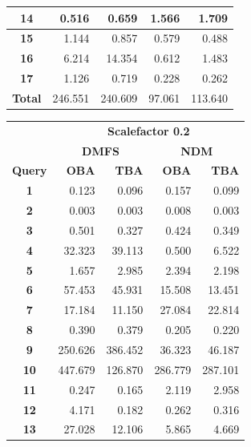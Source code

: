 \documentclass[a4paper]{article}
\begin{document}
\begin{figure}[h]
\begin{minipage}{0.5\linewidth}
\begin{tiny}
\begin{tabular}{|c|r|r|r|r|}
        \hline
        \textbf{14}&0.516&0.659&1.566&1.709\\
        \hline
        \textbf{15}&1.144&0.857&0.579&0.488\\
        \hline
        \textbf{16}&6.214&14.354&0.612&1.483\\
        \hline
        \textbf{17}&1.126&0.719&0.228&0.262\\
        \hline
        \textbf{Total}&246.551&240.609&97.061&113.640\\
        \hline
      \end{tabular}
    \end{tiny}
  \end{minipage} \hfill
  \begin{minipage}{0.5\linewidth}
    \begin{tiny}
      \begin{tabular}{|c|r|r|r|r|}
        \hline
        &\multicolumn{4}{c|}{\textbf{Scalefactor 0.2}}\\
        \cline{2-5}
        &\multicolumn{2}{c|}{\textbf{DMFS}}&\multicolumn{2}{c|}{\textbf{NDM}}\\
        \hline
        \textbf{Query}&\textbf{OBA}&\textbf{TBA}&\textbf{OBA}&\textbf{TBA}\\
        \hline
        \textbf{1}&0.123&0.096&0.157&0.099\\
        \hline
        \textbf{2}&0.003&0.003&0.008&0.003\\
        \hline
        \textbf{3}&0.501&0.327&0.424&0.349\\
        \hline
        \textbf{4}&32.323&39.113&0.500&6.522\\
        \hline
        \textbf{5}&1.657&2.985&2.394&2.198\\
        \hline
        \textbf{6}&57.453&45.931&15.508&13.451\\
        \hline
        \textbf{7}&17.184&11.150&27.084&22.814\\
        \hline
        \textbf{8}&0.390&0.379&0.205&0.220\\
        \hline
        \textbf{9}&250.626&386.452&36.323&46.187\\
        \hline
        \textbf{10}&447.679&126.870&286.779&287.101\\
        \hline
        \textbf{11}&0.247&0.165&2.119&2.958\\
        \hline
        \textbf{12}&4.171&0.182&0.262&0.316\\
        \hline
        \textbf{13}&27.028&12.106&5.865&4.669\\

\end{tabular}
\end{tiny}
\end{minipage}
\end{figure}
\end{document}
